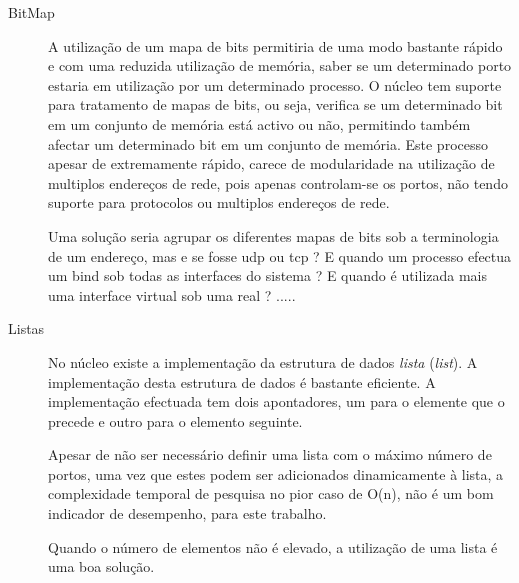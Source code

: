 \begin{description}

\item[BitMap]

A utilização de um mapa de bits permitiria de uma modo bastante rápido e com uma reduzida utilização de memória, saber se um determinado porto estaria em utilização por um determinado processo.
O núcleo tem suporte para tratamento de mapas de bits, ou seja, verifica se um determinado bit em um conjunto de memória está activo ou não, permitindo também afectar um determinado bit em um conjunto de memória.
Este processo apesar de extremamente rápido, carece de modularidade na utilização de multiplos endereços de rede, pois apenas controlam-se os portos, não tendo suporte para protocolos ou multiplos endereços de rede.
 
Uma solução seria agrupar os diferentes mapas de bits sob a terminologia de um endereço, mas e se fosse udp ou tcp ?
E quando um processo efectua um bind sob todas as interfaces do sistema ? 
E quando é utilizada mais uma interface virtual sob uma real ? .....


\item[Listas]

No núcleo existe a implementação da estrutura de dados \emph{lista} (\emph{list}).
A implementação desta estrutura de dados é bastante eficiente.
A implementação efectuada tem dois apontadores, um para o elemente que o precede e outro para o elemento seguinte.

Apesar de não ser necessário definir uma lista com o máximo número de portos, uma vez que estes podem ser adicionados dinamicamente à lista, a complexidade temporal de pesquisa no pior caso de O(n), não é um bom indicador de desempenho, para este trabalho.
 
Quando o número de elementos não é elevado, a utilização de uma lista é uma boa solução.





\end{description}
